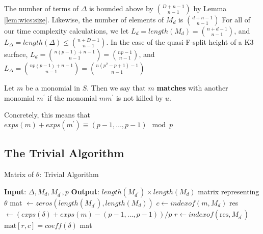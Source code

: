 \begin{rmk}
    The number of terms of \(\Delta\) is bounded 
    above by \(\binom{D+n-1}{n-1}\) by Lemma \ref{lem:wics:size}.
    Likewise, the number of elements of 
    \(M_{d}\) is \(\binom{d+n-1}{n-1}\)
    For all of our time complexity calculations, 
    we let $L_{d} = length(M_{d}) = \binom{n + d - 1}{n - 1}$, and $L_{\Delta} = length(\Delta) \leq \binom{n + D - 1}{n - 1}$.
    In the case of the quasi-F-split height of a K3 surface, 
    $L_{d} = \binom{n(p - 1) + n - 1}{n - 1} = \binom{np - 1}{n - 1}$, 
    and $L_{\Delta} = \binom{np(p - 1) + n - 1}{n - 1} = \binom{n(p^2 - p + 1) - 1}{n - 1}$
\end{rmk}


\begin{defn}
	Let \(m\) be a monomial in \(S\). 
	Then we say that \(m\) \textbf{matches}
	with another monomial \(m^{\prime}\) 
	if the monomial \(mm^{\prime}\) is
	not killed by \(u\).
\end{defn}

Concretely, this means that $exps(m) + exps(m^{\prime}) \equiv (p - 1, \dots, p - 1) \mod p$


\subsection{The Trivial Algorithm}

\begin{algorithm}[H]
    \caption{Matrix of $\theta$: Trivial Algorithm}
    \label{alg:matrix:trivial}
    \begin{algorithmic}[1]
    \State \textbf{Input}: $\Delta, M_{d}, M_{d^{\prime}}, p$
    \State \textbf{Output}: $length(M_{d^{\prime}}) \times length(M_{d})$ 
	matrix representing $\theta$
    \State mat $\gets zeros(length(M_{d^{\prime}}), length(M_{d}))$
	    \State $c \gets indexof(m, M _{d})$
        \For{$\delta \in \Delta$}
             
			\State res $\gets (exps(\delta) + exps(m) - (p-1, \ldots, p-1)) / p$ 
				\State $r \gets indexof(\text{res},M_{d^{\prime}})$
                \State $\text{mat}[r, c] = coeff(\delta)$
            \EndIf
        \EndFor
    \EndFor
    \State \Return mat
    \end{algorithmic}
\end{algorithm}

